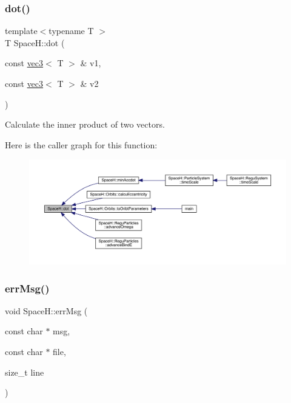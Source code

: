 \subsubsection{\texorpdfstring{dot()}{dot()}}
{\footnotesize\ttfamily template$<$typename T $>$ \\
T Space\+H\+::dot (\begin{DoxyParamCaption}\item[{const \mbox{\hyperlink{struct_space_h_1_1vec3}{vec3}}$<$ T $>$ \&}]{v1,  }\item[{const \mbox{\hyperlink{struct_space_h_1_1vec3}{vec3}}$<$ T $>$ \&}]{v2 }\end{DoxyParamCaption})\hspace{0.3cm}{\ttfamily [inline]}}



Calculate the inner product of two vectors. 

Here is the caller graph for this function\+:
\nopagebreak
\begin{figure}[H]
\begin{center}
\leavevmode
\includegraphics[width=350pt]{namespace_space_h_a8a469adb735b3a1d5c15b4a97278ad51_icgraph}
\end{center}
\end{figure}
\mbox{\label{namespace_space_h_af7bd0f1f17522b3122fa19f037a12ccc}} 
\subsubsection{\texorpdfstring{err\+Msg()}{ERR_MSG()}}
{\footnotesize\ttfamily void Space\+H\+::err\+Msg (\begin{DoxyParamCaption}\item[{const char $\ast$}]{msg,  }\item[{const char $\ast$}]{file,  }\item[{size\+\_\+t}]{line }\end{DoxyParamCaption})}

